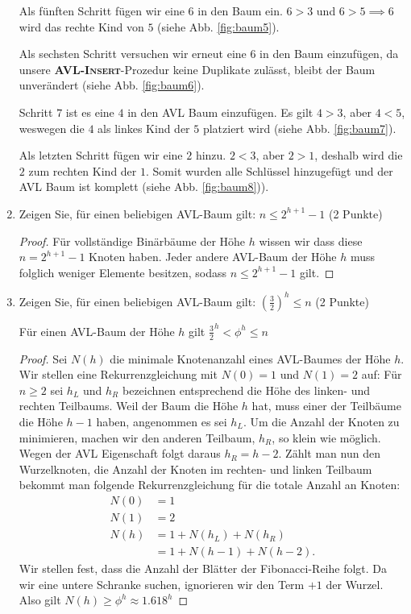 \documentclass[ngerman,landscape,twocolumn]{adtexsheet}
\begin{document}
\begin{question}
\begin{enumerate}
        Als fünften Schritt fügen wir eine $6$ in den Baum ein. $6>3$ und $6>5 \implies 6$ wird das rechte Kind von $5$ (siehe Abb. \ref{fig:baum5}).
        
        Als sechsten Schritt versuchen wir erneut eine $6$ in den Baum einzufügen, da unsere \textbf{\textsc{AVL-Insert}}-Prozedur keine Duplikate zulässt, bleibt der Baum unverändert (siehe Abb. \ref{fig:baum6}).
        
        Schritt $7$ ist es eine $4$ in den AVL Baum einzufügen. Es gilt $4>3$, aber $4<5$, weswegen die $4$ als linkes Kind der $5$ platziert wird (siehe Abb. \ref{fig:baum7}).
        
        Als letzten Schritt fügen wir eine $2$ hinzu. $2<3$, aber $2>1$, deshalb wird die $2$ zum rechten Kind der $1$. Somit wurden alle Schlüssel hinzugefügt und der AVL Baum ist komplett (siehe Abb. \ref{fig:baum8})). \hfill \qedsymbol

        \item  Zeigen Sie, für einen beliebigen AVL-Baum gilt: $n \leq 2^{h+1} - 1$ (2 Punkte)
        \begin{proof}
            Für vollständige Binärbäume der Höhe $h$ wissen wir dass diese $n = 2^{h+1} - 1$ Knoten haben. Jeder andere AVL-Baum der Höhe $h$ muss folglich weniger Elemente besitzen, sodass $n \leq 2^{h+1} - 1$ gilt.
        \end{proof}
        
        \item Zeigen Sie, für einen beliebigen AVL-Baum gilt: $(\frac{3}{2})^h \leq n$ (2 Punkte)
        \begin{behauptung}
            Für einen AVL-Baum der Höhe $h$ gilt $\frac{3}{2}^h < \phi^h \leq n$
        \end{behauptung}
        \begin{proof}
            Sei $N(h)$ die minimale Knotenanzahl eines AVL-Baumes der Höhe $h$. Wir stellen eine Rekurrenzgleichung mit $N(0) = 1$ und $N(1) = 2$ auf:
            Für $n\geq2$ sei $h_L$ und $h_R$ bezeichnen entsprechend die Höhe des linken- und rechten Teilbaums. Weil der Baum die Höhe $h$ hat, muss einer der Teilbäume die Höhe $h-1$ haben, angenommen es sei $h_L$.
            Um die Anzahl der Knoten zu minimieren, machen wir den anderen Teilbaum, $h_R$, so klein wie möglich. Wegen der AVL Eigenschaft folgt daraus $h_R = h-2$. Zählt man nun den Wurzelknoten, die Anzahl der Knoten im rechten- und linken Teilbaum bekommt man folgende Rekurrenzgleichung für die totale Anzahl an Knoten:
            \begin{align*}
                N(0) &= 1 \\
                N(1) &= 2 \\
                N(h) &= 1 + N(h_L) + N(h_R) \\
                &= 1 + N(h - 1) + N(h - 2).
            \end{align*}
            Wir stellen fest, dass die Anzahl der Blätter der Fibonacci-Reihe folgt. Da wir eine untere Schranke suchen, ignorieren wir den Term $+1$ der Wurzel.
            Also gilt $N(h) \geq \phi^h \approx 1.618^h$
            

\end{proof}
\end{enumerate}
\end{question}
\end{document}
